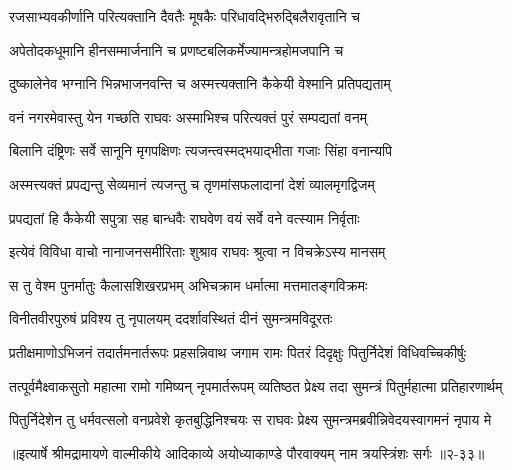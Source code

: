 \twolineshloka
{रजसाभ्यवकीर्णानि परित्यक्तानि दैवतैः}
{मूषकैः परिधावद्भिरुद्बिलैरावृतानि च} %

\twolineshloka
{अपेतोदकधूमानि हीनसम्मार्जनानि च}
{प्रणष्टबलिकर्मेज्यामन्त्रहोमजपानि च} %

\twolineshloka
{दुष्कालेनेव भग्नानि भिन्नभाजनवन्ति च}
{अस्मत्त्यक्तानि कैकेयी वेश्मानि प्रतिपद्यताम्} %

\twolineshloka
{वनं नगरमेवास्तु येन गच्छति राघवः}
{अस्माभिश्च परित्यक्तं पुरं सम्पद्यतां वनम्} %

\twolineshloka
{बिलानि दंष्ट्रिणः सर्वे सानूनि मृगपक्षिणः}
{त्यजन्त्वस्मद्भयाद्भीता गजाः सिंहा वनान्यपि} %

\twolineshloka
{अस्मत्त्यक्तं प्रपद्यन्तु सेव्यमानं त्यजन्तु च}
{तृणमांसफलादानां देशं व्यालमृगद्विजम्} %

\twolineshloka
{प्रपद्यतां हि कैकेयी सपुत्रा सह बान्धवैः}
{राघवेण वयं सर्वे वने वत्स्याम निर्वृताः} %

\twolineshloka
{इत्येवं विविधा वाचो नानाजनसमीरिताः}
{शुश्राव राघवः श्रुत्वा न विचक्रेऽस्य मानसम्} %

\twolineshloka
{स तु वेश्म पुनर्मातुः कैलासशिखरप्रभम्}
{अभिचक्राम धर्मात्मा मत्तमातङ्गविक्रमः} %

\twolineshloka
{विनीतवीरपुरुषं प्रविश्य तु नृपालयम्}
{ददर्शावस्थितं दीनं सुमन्त्रमविदूरतः} %

\twolineshloka
{प्रतीक्षमाणोऽभिजनं तदार्तमनार्तरूपः प्रहसन्निवाथ}
{जगाम रामः पितरं दिदृक्षुः पितुर्निदेशं विधिवच्चिकीर्षुः} %

\twolineshloka
{तत्पूर्वमैक्ष्वाकसुतो महात्मा रामो गमिष्यन् नृपमार्तरूपम्}
{व्यतिष्ठत प्रेक्ष्य तदा सुमन्त्रं पितुर्महात्मा प्रतिहारणार्थम्} %

\twolineshloka
{पितुर्निदेशेन तु धर्मवत्सलो वनप्रवेशे कृतबुद्धिनिश्चयः}
{स राघवः प्रेक्ष्य सुमन्त्रमब्रवीन्निवेदयस्वागमनं नृपाय मे} %


॥इत्यार्षे श्रीमद्रामायणे वाल्मीकीये आदिकाव्ये अयोध्याकाण्डे पौरवाक्यम् नाम त्रयस्त्रिंशः सर्गः ॥२-३३॥
